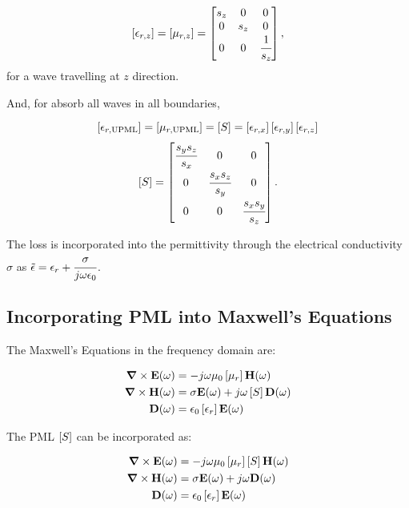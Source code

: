 \begin{equation}
    \brackets{\epsilon_{r,z}} = \brackets{\mu_{r,z}} = \begin{bmatrix}
        s_z & 0 & 0 \\
        0 & s_z & 0 \\
        0 & 0 & \cfrac{1}{s_z}
    \end{bmatrix},
\end{equation}
for a wave travelling at $z$ direction.

And, for absorb all waves in all boundaries,

\begin{equation}
    \brackets{\epsilon_{r,\textnormal{UPML}}} = \brackets{\mu_{r,\textnormal{UPML}}} = \brackets{S} = \brackets{\epsilon_{r,x}}\brackets{\epsilon_{r,y}}\brackets{\epsilon_{r,z}} \nonumber
\end{equation} 
\begin{equation}
    \brackets{S} = \begin{bmatrix}
        \cfrac{s_ys_z}{s_x} & 0 & 0 \\
        0 & \cfrac{s_xs_z}{s_y} & 0 \\
        0 & 0 & \cfrac{s_xs_y}{s_z}
    \end{bmatrix}.
\end{equation}

The loss is incorporated into the permittivity through the electrical conductivity $\sigma$ as $\tilde{\epsilon} = \epsilon_r + \cfrac{\sigma}{j\omega \epsilon_0}$.

\subsection{Incorporating PML into Maxwell's Equations}

The Maxwell's Equations in the frequency domain are:

\begin{align}
    \rot \E (\omega) &= -j\omega \mu_0 \brackets{\mu_r} \Hh (\omega) \\
    \rot \Hh (\omega) &= \sigma \E(\omega) + j\omega\brackets{S} \D (\omega) \\
    \D (\omega) &= \epsilon_0 \brackets{\epsilon _r}\E (\omega)
\end{align}

The PML $\brackets{S}$ can be incorporated as:

\begin{align}
    \rot \E (\omega) &= -j\omega \mu_0 \brackets{\mu_r} \brackets{S} \Hh (\omega) \\
    \rot \Hh (\omega) &= \sigma \E(\omega) + j\omega \D (\omega) \\
    \D (\omega) &= \epsilon_0 \brackets{\epsilon _r} \E (\omega)
\end{align}

